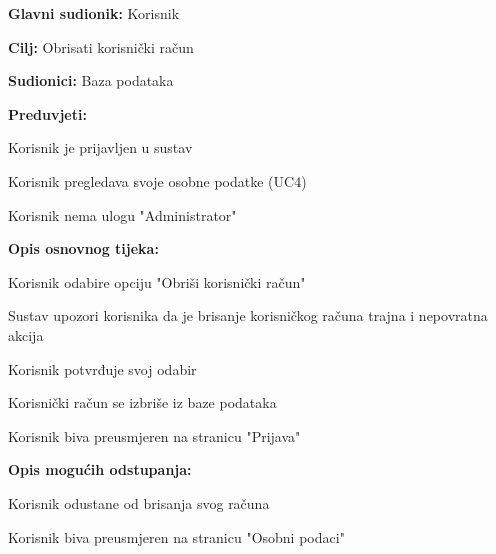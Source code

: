 					\noindent {}
					\begin{packed_item}
	
						\item \textbf{Glavni sudionik: }Korisnik
						\item  \textbf{Cilj:} Obrisati korisnički račun
						\item  \textbf{Sudionici:} Baza podataka
						\item  \textbf{Preduvjeti:}
						\item[] \begin{packed_enum}
							\item Korisnik je prijavljen u sustav
							\item Korisnik pregledava svoje osobne podatke (UC4)
							\item Korisnik nema ulogu "Administrator"
						\end{packed_enum}
						\item  \textbf{Opis osnovnog tijeka:}
						
						\item[] \begin{packed_enum}
	
							\item Korisnik odabire opciju "Obriši korisnički račun"
							\item Sustav upozori korisnika da je brisanje korisničkog računa trajna i nepovratna akcija
							\item Korisnik potvrđuje svoj odabir
							\item Korisnički račun se izbriše iz baze podataka
							\item Korisnik biva preusmjeren na stranicu "Prijava"
							
						\end{packed_enum}
						
						\item  \textbf{Opis mogućih odstupanja:}
						
						\item[] \begin{packed_item}
	
							\item[3.a] Korisnik odustane od brisanja svog računa
							\item[] \begin{packed_enum}
								
								\item Korisnik biva preusmjeren na stranicu "Osobni podaci"
														
							\end{packed_enum}
							
						\end{packed_item}
					\end{packed_item}
					

